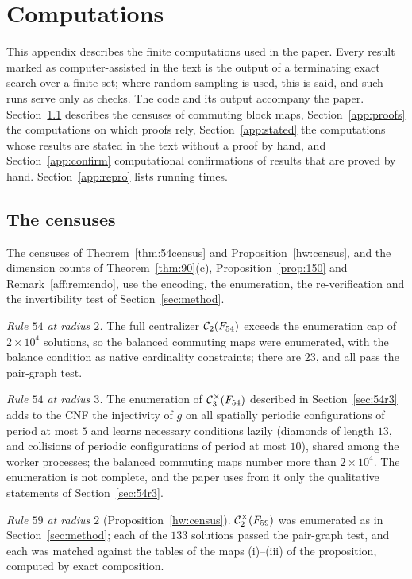 \section{Computations}\label{app:comp}

This appendix describes the finite computations used in the paper. Every result marked as computer-assisted in the text is the output of a terminating exact search over a finite set; where random sampling is used, this is said, and such runs serve only as checks. The code and its output accompany the paper. Section~\ref{app:census} describes the censuses of commuting block maps, Section~\ref{app:proofs} the computations on which proofs rely, Section~\ref{app:stated} the computations whose results are stated in the text without a proof by hand, and Section~\ref{app:confirm} computational confirmations of results that are proved by hand. Section~\ref{app:repro} lists running times.

\subsection{The censuses}\label{app:census}

The censuses of Theorem~\ref{thm:54census} and Proposition~\ref{hw:census}, and the dimension counts of Theorem~\ref{thm:90}(c), Proposition~\ref{prop:150} and Remark~\ref{aff:rem:endo}, use the encoding, the enumeration, the re-verification and the invertibility test of Section~\ref{sec:method}.

\emph{Rule $54$ at radius $2$.} The full centralizer $\mathcal{C}_2(F_{54})$ exceeds the enumeration cap of $2\times10^4$ solutions, so the balanced commuting maps were enumerated, with the balance condition as native cardinality constraints; there are $23$, and all pass the pair-graph test.

\emph{Rule $54$ at radius $3$.} The enumeration of $\mathcal{C}^{\times}_3(F_{54})$ described in Section~\ref{sec:54r3} adds to the CNF the injectivity of $g$ on all spatially periodic configurations of period at most $5$ and learns necessary conditions lazily (diamonds of length $13$, and collisions of periodic configurations of period at most $10$), shared among the worker processes; the balanced commuting maps number more than $2\times10^4$. The enumeration is not complete, and the paper uses from it only the qualitative statements of Section~\ref{sec:54r3}.

\emph{Rule $59$ at radius $2$} (Proposition~\ref{hw:census}). $\mathcal{C}^{\times}_2(F_{59})$ was enumerated as in Section~\ref{sec:method}; each of the $133$ solutions passed the pair-graph test, and each was matched against the tables of the maps (i)--(iii) of the proposition, computed by exact composition.

